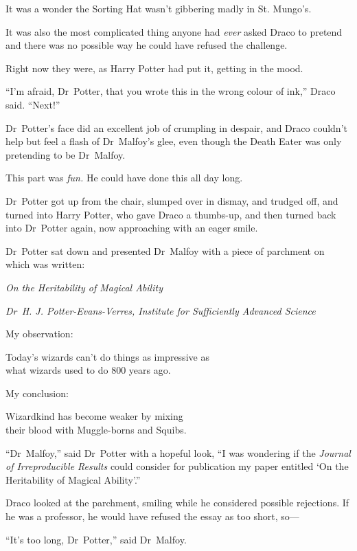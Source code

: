 It was a wonder the Sorting Hat wasn’t gibbering madly in St. Mungo’s.

It was also the most complicated thing anyone had \emph{ever} asked Draco to pretend and there was no possible way he could have refused the challenge.

Right now they were, as Harry Potter had put it, getting in the mood.

“I’m afraid, Dr~Potter, that you wrote this in the wrong colour of ink,” Draco said. “Next!”

Dr~Potter’s face did an excellent job of crumpling in despair, and Draco couldn’t help but feel a flash of Dr~Malfoy’s glee, even though the Death Eater was only pretending to be Dr~Malfoy.

This part was \emph{fun.} He could have done this all day long.

Dr~Potter got up from the chair, slumped over in dismay, and trudged off, and turned into Harry Potter, who gave Draco a thumbs-up, and then turned back into Dr~Potter again, now approaching with an eager smile.

Dr~Potter sat down and presented Dr~Malfoy with a piece of parchment on which was written:

\begin{center}
\emph{On the Heritability of Magical Ability}

\emph{Dr~H. J. Potter-Evans-Verres, Institute for Sufficiently Advanced Science}
\end{center}

\begin{writtenNote}
My observation:

Today’s wizards can’t do things as impressive as\\
what wizards used to do 800 years ago.

My conclusion:

Wizardkind has become weaker by mixing\\
their blood with Muggle-borns and Squibs.
\end{writtenNote}

“Dr~Malfoy,” said Dr~Potter with a hopeful look, “I was wondering if the \emph{Journal of Irreproducible Results} could consider for publication my paper entitled ‘On the Heritability of Magical Ability’.”

Draco looked at the parchment, smiling while he considered possible rejections. If he was a professor, he would have refused the essay as too short, so—

“It’s too long, Dr~Potter,” said Dr~Malfoy.


